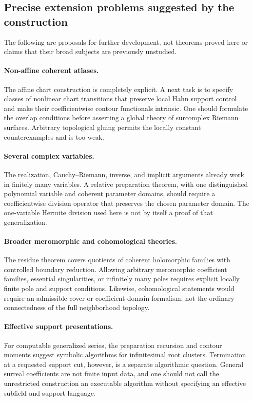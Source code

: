\documentclass[11pt,letterpaper]{article}
\numberwithin{equation}{section}
\theoremstyle{definition}
\theoremstyle{remark}
\begin{document}
\subsection{Precise extension problems suggested by the construction}

The following are proposals for further development, not theorems proved
here or claims that their broad subjects are previously unstudied.

\paragraph{Non-affine coherent atlases.}
The affine chart construction is completely explicit. A next task is to
specify classes of nonlinear chart transitions that preserve local Hahn
support control and make their coefficientwise contour functionals
intrinsic. One should formulate the overlap conditions before asserting
a global theory of surcomplex Riemann surfaces. Arbitrary topological
gluing permits the locally constant counterexamples and is too weak.

\paragraph{Several complex variables.}
The realization, Cauchy--Riemann, inverse, and implicit arguments already
work in finitely many variables. A relative preparation theorem, with
one distinguished polynomial variable and coherent parameter domains,
should require a coefficientwise division operator that preserves the
chosen parameter domain. The one-variable Hermite division used here
is not by itself a proof of that generalization.

\paragraph{Broader meromorphic and cohomological theories.}
The residue theorem covers quotients of coherent holomorphic families
with controlled boundary reduction. Allowing arbitrary meromorphic
coefficient families, essential singularities, or infinitely many poles
requires explicit locally finite pole and support conditions. Likewise,
cohomological statements would require an admissible-cover or
coefficient-domain formalism, not the ordinary connectedness of the
full neighborhood topology.

\paragraph{Effective support presentations.}
For computable generalized series, the preparation recursion and contour
moments suggest symbolic algorithms for infinitesimal root clusters.
Termination at a requested support cut, however, is a separate algorithmic
question. General surreal coefficients are not finite input data, and
one should not call the unrestricted construction an executable
algorithm without specifying an effective subfield and support language.
\end{document}
